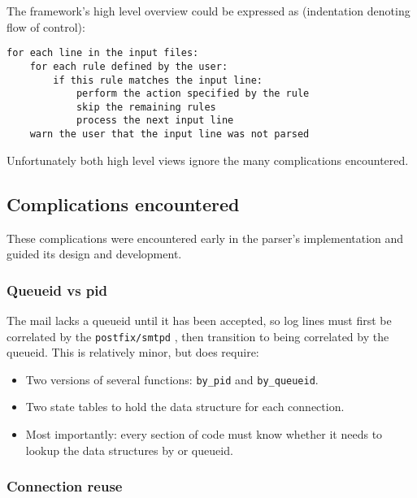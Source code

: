 \documentclass[a4paper,12pt,draft]{article}
\newcommand{\daemon}[1]{%
    \texttt{postfix/#1}%
}
\begin{document}
The framework's high level overview could be expressed as (indentation
denoting flow of control):

\begin{verbatim}
for each line in the input files:
    for each rule defined by the user:
        if this rule matches the input line:
            perform the action specified by the rule
            skip the remaining rules
            process the next input line
    warn the user that the input line was not parsed
\end{verbatim}

Unfortunately both high level views ignore the many complications
encountered.


\subsection{Complications encountered}

\label{complications}

These complications were encountered early in the parser's implementation
and guided its design and development.

\subsubsection{Queueid vs pid}

The mail lacks a queueid until it has been accepted, so log lines must
first be correlated by the \daemon{smtpd} \pid{}, then transition to being
correlated by the queueid.  This is relatively minor, but does require:

\begin{itemize}

    \item Two versions of several functions: \texttt{by\_pid} and
        \texttt{by\_queueid}.

    \item Two state tables to hold the data structure for each connection.

    \item Most importantly: every section of code must know whether it
        needs to lookup the data structures by \pid{} or queueid.

\end{itemize}

\subsubsection{Connection reuse}
\end{document}
